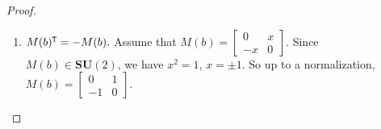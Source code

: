 \begin{proof}
\begin{enumerate}
\begin{itemize}
            \item If $x+z=0$, $M(b)=\left[\begin{matrix}
                x & y\\
                y & -x
            \end{matrix}\right].$
            By $M(b)\in \mathbf{SU}(2)$, 
            we have $x^2+y^2=-1$ and 
            $M(b)M(b)^\dagger=\left[\begin{matrix}
                |x|^2+|y|^2 & x\overline{y}-\overline{x}y\\
                \overline{x}y-x\overline{y} & |x|^2+|y|^2
            \end{matrix}\right]=\pm I_2$. 
            So $x\overline{y}=\overline{x}y$.
            If $xy\neq 0$, then $\arg(x)=\arg(y)$.
            After a normalization, we may assume $x,y\in \mathbb{R}$.
            If $xy=0$, we may still normalize and assume $x,y\in \mathbb{R}.$
            Since $x^2+y^2=-1$, we may assume $x=\mathfrak{i}\cos(2\theta)$ and $y=\mathfrak{i}\sin(2\theta).$
            Let $T=\left[\begin{matrix}
                \cos \theta & -\sin \theta\\
                \sin \theta & \cos \theta
            \end{matrix}\right]\in \mathbf{SO}(2).$
            A direct calculation shows that $T^{\tt T}M(b)T=\left[\begin{matrix}
                \mathfrak{i} & 0\\
                0 & -\mathfrak{i}
            \end{matrix}\right].$
            So the lemma is true by a $T$-transformation.
        \end{itemize}
        
        \item 
        $M(b)^{\tt T}=-M(b).$
        Assume that 
        $M(b)=\left[\begin{matrix}
                0 & x\\
                -x & 0
            \end{matrix}\right].$
        Since $M(b)\in \mathbf{SU}(2)$, we have $x^2=1$, $x=\pm 1$.
        So up to a normalization, $M(b)=\left[\begin{matrix}
                0 & 1\\
                -1 & 0
            \end{matrix}\right].$
    \end{enumerate}
\end{proof}

